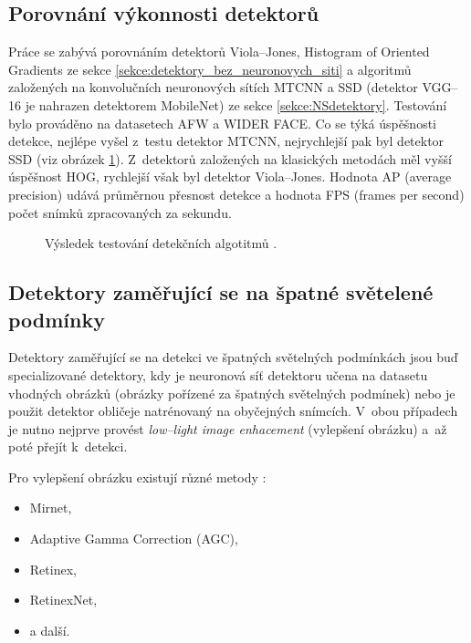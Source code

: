 \subsection*{Porovnání výkonnosti detektorů}
Práce \cite{fdCNNComparison} se zabývá porovnáním detektorů Viola--Jones, Histogram of Oriented Gradients ze sekce \ref{sekce:detektory_bez_neuronovych_siti} a algoritmů založených na konvolučních neuronových sítích MTCNN a SSD (detektor VGG--16 je nahrazen detektorem MobileNet) ze sekce \ref{sekce:NSdetektory}. Testování bylo prováděno na datasetech AFW a WIDER FACE. Co se týká úspěšnosti detekce, nejlépe vyšel z~testu detektor MTCNN, nejrychlejší pak byl detektor SSD (viz obrázek \ref{obrazek:cnncomparison}). Z~detektorů založených na klasických metodách měl vyšší úspěšnost HOG, rychlejší však byl detektor Viola--Jones. Hodnota AP (average precision) udává průměrnou přesnost detekce a hodnota FPS (frames per second) počet snímků zpracovaných za sekundu.

\begin{figure}[H]
  \begin{center}
  \label{obrazek:cnncomparison}
  \caption{Výsledek testování detekčních algotitmů \cite{fdCNNComparison}.}
  \end{center}
\end{figure}

\subsection*{Detektory zaměřující se na špatné světelené podmínky}
Detektory zaměřující se na detekci ve špatných světelných podmínkách jsou buď specializované detektory, kdy je neuronová síť detektoru učena na datasetu vhodných obrázků (obrázky pořízené za špatných světelných podmínek) nebo je použit detektor obličeje natrénovaný na obyčejných snímcích. V~obou případech je nutno nejprve provést \emph{low--light image enhacement} (vylepšení obrázku) a~až poté přejít k~detekci.

Pro vylepšení obrázku existují různé metody \cite{lowLightFdReview}:
\begin{itemize}
  \item Mirnet,
  \item Adaptive Gamma Correction (AGC),
  \item Retinex,
  \item RetinexNet,
  \item a další.
\end{itemize}

